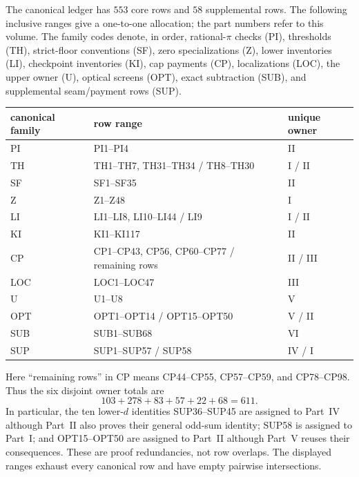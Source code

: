 \documentclass[11pt]{article}
\begin{document}
The canonical ledger has \(553\) core rows and \(58\) supplemental rows.
The following inclusive ranges give a one-to-one allocation; the part numbers
refer to this volume.  The family codes denote, in order, rational-\(\pi\)
checks (PI), thresholds (TH), strict-floor conventions (SF), zero
specializations (Z), lower inventories (LI), checkpoint inventories (KI),
cap payments (CP), localizations (LOC), the upper owner (U), optical screens
(OPT), exact subtraction (SUB), and supplemental seam/payment rows (SUP).
\begin{center}
\small
\begin{tabular}{@{}lll@{}}
\toprule
canonical family&row range&unique owner\\
\midrule
PI&PI1--PI4&II\\
TH&TH1--TH7, TH31--TH34 / TH8--TH30&I / II\\
SF&SF1--SF35&II\\
Z&Z1--Z48&I\\
LI&LI1--LI8, LI10--LI44 / LI9&I / II\\
KI&KI1--KI117&II\\
CP&CP1--CP43, CP56, CP60--CP77 / remaining rows&II / III\\
LOC&LOC1--LOC47&III\\
U&U1--U8&V\\
OPT&OPT1--OPT14 / OPT15--OPT50&V / II\\
SUB&SUB1--SUB68&VI\\
SUP&SUP1--SUP57 / SUP58&IV / I\\
\bottomrule
\end{tabular}
\end{center}
Here ``remaining rows'' in CP means CP44--CP55, CP57--CP59, and
CP78--CP98.  Thus the six disjoint owner totals are
\[
 103+278+83+57+22+68=611.
\]
In particular, the ten lower-\(d\) identities SUP36--SUP45 are assigned to
Part~IV although Part~II also proves their general odd-sum identity; SUP58
is assigned to Part~I; and OPT15--OPT50 are assigned to Part~II although
Part~V reuses their consequences.  These are proof redundancies, not row
overlaps.  The displayed ranges exhaust every canonical row and have empty
pairwise intersections.

\renewcommand{\thesection}{\Roman{section}}
\makeatletter
\renewcommand*\l@section[2]{%
  \ifnum\c@tocdepth>\z@
    \addpenalty\@secpenalty
    \addvspace{1.0em \@plus\p@}%
    \setlength\@tempdima{2.7em}%
    \begingroup
      \parindent\z@ \rightskip\@pnumwidth
      \parfillskip-\@pnumwidth
      \leavevmode\bfseries
      \advance\leftskip\@tempdima
      \hskip-\leftskip
      #1\nobreak\hfil\nobreak
      \hb@xt@\@pnumwidth{\hss #2\kern-\p@\kern\p@}\par
    \endgroup
  \fi}
\makeatother
\tableofcontents
\clearpage
\end{document}
